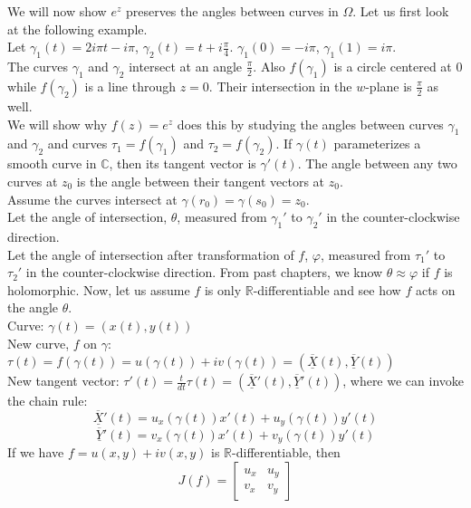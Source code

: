\documentclass[11pt]{article}
\begin{document}
We will now show $e^z$ preserves the angles between curves in $\Omega$. Let us first look at the following example. \\ 
Let $\gamma_1(t) = 2i\pi t - i\pi$, $\gamma_2(t) = t + i\frac{\pi}{4}$. $\gamma_1(0) = -i\pi$, $\gamma_1(1) = i\pi$. \\
The curves $\gamma_1$ and $\gamma_2$ intersect at an angle $\frac{\pi}{2}$. Also $f(\gamma_1)$ is a circle centered at 0 while $f(\gamma_2)$ is a line through $z = 0$. Their intersection in the $w$-plane is $\frac{\pi}{2}$ as well. \\
We will show why $f(z) = e^z$ does this by studying the angles between curves $\gamma_1$ and $\gamma_2$ and curves $\tau_1 = f(\gamma_1)$ and $\tau_2 = f(\gamma_2)$. 
If $\gamma(t)$ parameterizes a smooth curve in $\mathbb{C}$, then its tangent vector is $\gamma'(t)$. The angle between any two curves at $z_0$ is the angle between their tangent vectors at $z_0$. \\
Assume the curves intersect at $\gamma(r_0) = \gamma(s_0) = z_0$. \\
Let the angle of intersection, $\theta$, measured from $\gamma_1'$ to $\gamma_2'$ in the counter-clockwise direction. \\
Let the angle of intersection after transformation of $f$, $\varphi$, measured from $\tau_1'$ to $\tau_2'$ in the counter-clockwise direction. From past chapters, we know $\theta \approx \varphi$ if $f$ is holomorphic. Now, let us assume $f$ is only $\mathbb{R}$-differentiable and see how $f$ acts on the angle $\theta$. \\
Curve: $\gamma(t) = (x(t), y(t))$ \\
New curve, $f$ on $\gamma$: $\tau(t) = f(\gamma(t)) = u(\gamma(t)) + iv(\gamma(t)) = (\overline{\underline {X}}(t), \overline{\underline {Y}}(t))$ \\
New tangent vector: $\tau'(t) = \frac{t}{dt}\tau(t) = (\overline{\underline {X}}'(t), \overline{\underline {Y}}'(t))$, where we can invoke the chain rule: \\
$$\overline{\underline {X}}'(t) = u_x(\gamma(t))x'(t) + u_y(\gamma(t))y'(t)$$ 
$$\overline{\underline {Y}}'(t) = v_x(\gamma(t))x'(t) + v_y(\gamma(t))y'(t)$$
If we have $f = u(x, y) + iv(x, y)$ is $\mathbb{R}$-differentiable, then 
\begin{equation*}
J(f) = 
\begin{bmatrix}
 u_x & u_y \\
 v_x & v_y
\end{bmatrix}
\end{equation*}
\end{document}

